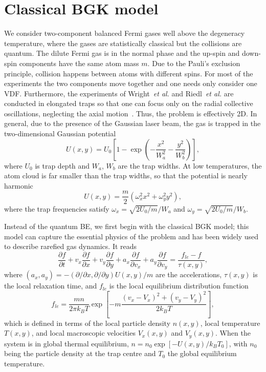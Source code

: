 \section{Classical BGK model}

We consider two-component balanced Fermi gases well above the degeneracy temperature, where the gases are statistically classical but the collisions are quantum. The dilute Fermi gas is in the normal phase and the up-spin and down-spin components have the same atom mass $m$.  Due to the Pauli's exclusion principle, collision happens between atoms with different spins. For most of the experiments the two components move together and one needs only consider one VDF. Furthermore, the experiments of Wright~\textit{et al.} and Riedl~\textit{et al.} are conducted in elongated traps so that one can focus only on the radial collective oscillations, neglecting the axial motion~\cite{Wright2007,Riedl2008,Altmeyer2007}. Thus, the problem is effectively 2D. In general, due to the presence of the Gaussian laser beam, the gas is trapped in the two-dimensional Gaussian potential
\begin{equation}\label{gaussian}
    U(x,y)=U_0\left[1-\exp\left(-\frac{x^2}{W_a^2}-\frac{y^2}{W_b^2}\right)\right],
\end{equation}
where $U_0$ is trap depth and $W_a$, $W_b$ are the trap widths.
At low temperatures, the atom cloud is far smaller than the trap widths, so that the potential is nearly harmonic
\begin{equation}\label{harmonic}
    U(x,y)=\frac{m}{2}(\omega_x^2x^2+\omega_y^2y^2),
\end{equation}
where the trap frequencies satisfy $\omega_x=\sqrt{2U_0/m}/W_a$ and
$\omega_y=\sqrt{2U_0/m}/W_b$.


Instead of the quantum BE, we first begin with the classical BGK model; this model can capture the essential physics of the problem and has been widely used to describe rarefied gas dynamics. It reads
\begin{equation}\label{bgk}
    \frac{\partial f}{\partial t}+v_x\frac{\partial f}{\partial x}+v_y\frac{\partial f}{\partial y}+a_x\frac{\partial f}     {\partial v_x}+a_y\frac{\partial f}{\partial v_y}=\frac{f_{le}-f}{\tau(x,y)},
\end{equation}
where $(a_x,a_y)=-(\partial/\partial x,\partial/\partial y)U(x,y)/m$ are the accelerations, $\tau(x,y)$ is the local relaxation time, and $f_{le}$ is the local equilibrium distribution function 
\begin{equation}\label{gle}
   f_{le}=\frac{mn}{{2\pi     k_BT}}\exp\left[-m\frac{(v_x-V_x)^2+(v_y-V_y)^2}{2k_BT}\right],
\end{equation}
which is defined in terms of the local particle density $n(x,y)$, local temperature $T(x,y)$, and local macroscopic velocities $V_x(x,y)$ and $V_y(x,y)$. When the system is in global thermal equilibrium, $n=n_0\exp[-U(x,y)/k_BT_0]$, with $n_0$ being the particle density at the trap centre and $T_0$ the global equilibrium temperature.


